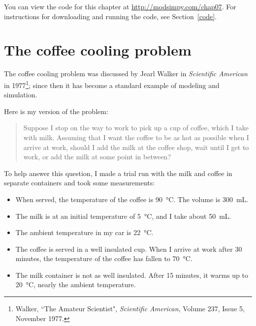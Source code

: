 \documentclass[12pt]{book}
\theoremstyle{exercise}
\begin{document}
You can view the code for this chapter at \url{http://modsimpy.com/chap07}.  For instructions for downloading and running the code, see Section~\ref{code}.

\section{The coffee cooling problem}

The coffee cooling problem was discussed by Jearl Walker in {\it Scientific American} in 1977\footnote{Walker, ``The Amateur Scientist", {\it Scientific American}, Volume 237, Issue 5, November 1977.}; since then it has become a standard example of modeling and simulation.

Here is my version of the problem:

\begin{quote}
Suppose I stop on the way to work to pick up a cup of coffee, which I take with milk.  Assuming that I want the coffee to be as hot as possible when I arrive at work, should I add the milk at the coffee shop, wait until I get to work, or add the milk at some point in between?
\end{quote}

To help answer this question, I made a trial run with the milk and coffee in separate containers and took some measurements:

\begin{itemize}

\item When served, the temperature of the coffee is \SI{90}{\celsius}.  The volume is \SI{300}{mL}.

\item The milk is at an initial temperature of \SI{5}{\celsius}, and I take about \SI{50}{mL}.

\item The ambient temperature in my car is \SI{22}{\celsius}.

\item The coffee is served in a well insulated cup.  When I arrive at work after 30 minutes, the temperature of the coffee has fallen to \SI{70}{\celsius}.

\item The milk container is not as well insulated.  After 15 minutes, it warms up to \SI{20}{\celsius}, nearly the ambient temperature.

\end{itemize}
\end{document}

